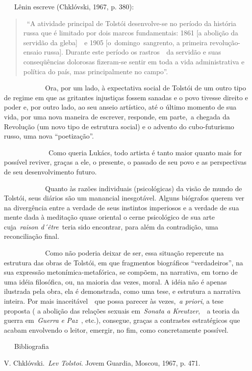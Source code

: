 ~~~Lênin escreve (Chklóvski, 1967, p. 380):

\begin{quote}
~``A atividade principal de Tolstói desenvolve-se no período da história
russa que é limitado por dois marcos fundamentais: 1861 {[}a abolição da
servidão da gleba{]}~~e 1905 {[}o~domingo~sangrento, a primeira
revolução-ensaio russa{]}. Durante este período os rastros~~da servidão
e suas conseqüências dolorosas fizeram-se sentir em toda a vida
administrativa e política do país, mas principalmente no campo''.
\end{quote}

~~~~~~~~~~~~Ora, por um lado, à expectativa social de Tolstói de um
outro tipo de regime em que as gritantes injustiças fossem sanadas e o
povo tivesse direito e poder e, por outro lado, ao seu anseio artístico,
até o último momento de sua vida, por uma nova maneira de escrever,
responde, em parte,~a chegada da Revolução (um novo tipo de estrutura
social) e o advento do cubo-futurismo russo, uma nova ``poetização''.

~~~~~~~~~~~~~Como queria Lukács, todo artista é tanto maior quanto mais
for possível reviver, graças a ele, o presente, o passado de seu povo e
as perspectivas de seu desenvolvimento futuro.

~~~~~~~~~~~~Quanto às razões individuais (psicológicas) da visão de
mundo de Tolstói, seus diários são um manancial inesgotável. Alguns
biógrafos querem ver na divergência entre a verdade de seus instintos
imperiosos e a verdade de sua mente dada à meditação quase oriental o
cerne psicológico de sua arte cuja~\emph{raison d´être}~teria sido
encontrar, para além da contradição, uma reconciliação final.

~~~~~~~~~~~~Como não poderia deixar de ser, essa situação repercute na
estrutura das obras de Tolstói, em que fragmentos biográficos
``verdadeiros'', na sua expressão metonímica-metafórica, se compõem, na
narrativa, em torno de uma idéia filosófica, ou, na maioria das vezes,
moral. A idéia não é apenas ilustrada pela obra, ela é demonstrada, como
uma tese, e estrutura a narrativa inteira. Por mais inaceitável~~que
possa parecer às vezes,~\emph{a priori}, a tese proposta ( a abolição
das relações sexuais em~\emph{Sonata a Kreutzer},~~a teoria da guerra
em~\emph{Guerra e Paz}~, etc.), consegue, graças a contrastes
estratégicos que acabam envolvendo o leitor, emergir, no fim, como
concretamente possível.

~~~Bibliografia

V. Chklóvski.~\emph{Lev Tolstoi}. Jovem Guardia, Moscou, 1967, p. 471.

